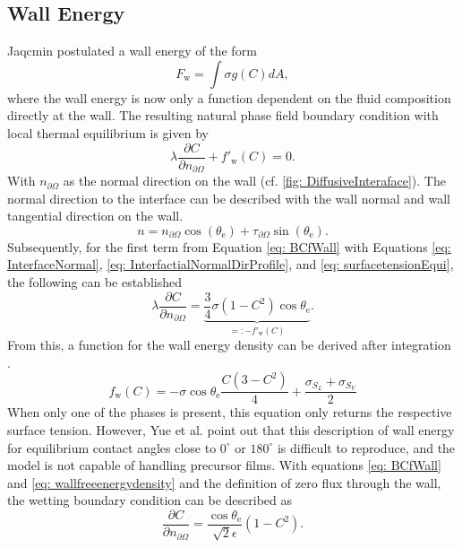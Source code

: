 \subsection{Wall Energy}
Jaqcmin \cite{jacqmin1999CalculationTwoPhaseNavier} postulated a wall energy of the form
\begin{equation}
    F_{\mathrm{w}}=\int \sigma g(C)dA, 
\end{equation}
where the wall energy is now only a function dependent on the fluid composition directly at the wall. The resulting natural phase field boundary condition with local thermal equilibrium is given by
\begin{equation}
    \label{eq: BCfWall}
    \lambda \frac{\partial C}{\partial n_{\partial \Omega}} + f'_{\mathrm{w}}(C) =0.
\end{equation}
With $n_{\partial \Omega}$ as the normal direction on the wall (cf. \ref{fig: DiffusiveInteraface}).
The normal direction to the interface can be described with the wall normal and wall tangential direction on the wall. 
\begin{equation}
    \label{eq: InterfaceNormal}
    n=n_{\partial\Omega}\cos{(\theta_{\mathrm{e}})}+\tau_{\partial\Omega}\sin{(\theta_{\mathrm{e}})}.
\end{equation}
Subsequently, for the first term from Equation \ref{eq: BCfWall} with Equations \ref{eq: InterfaceNormal}, \ref{eq: InterfactialNormalDirProfile}, and \ref{eq: surfacetensionEqui}, the following can be established
\begin{equation}
    \lambda\frac{\partial C}{\partial n_{\partial\Omega}} =\underbrace{\frac{3}{4}\sigma\left(1-C^2\right)\cos\theta_{\mathrm{e}}}_{=:-f'_\mathrm{w}(C)}.
\end{equation}
From this, a function for the wall energy density can be derived after integration \cite{jacqmin2000ContactlineDynamicsDiffuse}\cite{holzinger2021DirectNumericalSimulation}.
\begin{equation}
    \label{eq: wallfreeenergydensity}
    f_{\mathrm{w}}(C)=-\sigma \cos\theta_{\mathrm{e}} \frac{C(3-C^2)}{4} + \frac{\sigma_{S_L}+ \sigma_{S_V}}{2}
\end{equation}
When only one of the phases is present, this equation only returns the respective surface tension. However, Yue et al. \cite{yue2011WallEnergyRelaxation} point out that this description of wall energy for equilibrium contact angles close to $0^{\circ}$ or $180^{\circ}$ is difficult to reproduce, and the model is not capable of handling precursor films.
With equations \ref{eq: BCfWall} and \ref{eq: wallfreeenergydensity} and the definition of zero flux through the wall, the wetting boundary condition can be described as
\begin{equation}
    \frac{\partial C}{\partial n_{\partial\Omega}} = \frac{\cos \theta_{\mathrm{e}}}{\sqrt{2}\epsilon}(1-C^2).
\end{equation}

